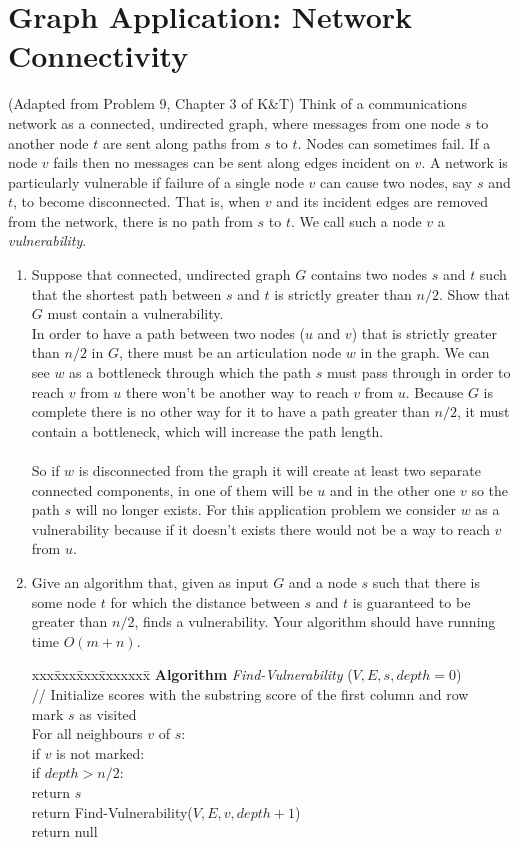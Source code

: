 \documentclass[11pt]{article}
\def\ans#1{{\color{ans}#1}}
\begin{document}
\section{Graph Application: Network Connectivity}
\label{sec-4}
(Adapted from Problem 9, Chapter 3 of K\&T) Think of a communications
network  as a connected, undirected graph, where messages from one node $s$ to another node
$t$ are sent along paths from $s$ to $t$.  Nodes can sometimes fail.
If a node $v$ fails then no messages can be sent along edges incident
on $v$. A network is particularly vulnerable if failure of a
single node $v$ can cause two nodes, say $s$ and $t$, to become
disconnected. That is, when $v$ and its incident edges are removed
from the network, there is no path from $s$ to $t$.
We call such a node $v$ a \emph{vulnerability}.

\begin{enumerate}
\item Suppose that connected, undirected graph $G$ contains two nodes $s$ and $t$ such
that the shortest path between $s$ and $t$ is strictly greater than
$n/2$. Show that $G$ must contain a vulnerability. \\
\ans{
  In order to have a path between two nodes ($u$ and $v$) that is strictly greater than $n/2$ in $G$, 
  there must be an articulation node $w$ in the graph. We can see $w$ as a bottleneck through which the 
  path $s$ must pass through in order to reach $v$ from $u$ there won't be another way to reach $v$ 
  from $u$. Because $G$ is complete there is no other way for it to have a path greater than $n/2$, 
  it must contain a bottleneck, which will increase the path length. \\ \\
  So if $w$ is disconnected from the graph it will create at least two separate connected 
  components, in one of them will be $u$ and in the other one $v$ so the path $s$ will 
  no longer exists. For this application problem we consider $w$ as a vulnerability 
  because if it doesn't exists there would not be a way to reach $v$ from $u$.
}

\item Give an algorithm that, given as input $G$ and a node $s$ such that
there is some node $t$ for which the distance between $s$ and $t$
is guaranteed to be greater than $n/2$, finds a vulnerability. Your
algorithm should have running time $O(m + n)$.
\begin{tabbing}
  xxx\=xxx\=xxx\=xxxxxxx\= \kill \color{ans}
  {\bf Algorithm} {\em Find-Vulnerability} ($V,E,s, depth=0$)\\ [0pt \color{ans}]
  \> // Initialize scores with the substring score of the first column and row \\
  \> mark $s$ as visited \\
  \> For all neighbours $v$ of $s$: \\
  \>\> if $v$ is not marked: \\
  \>\>\> if $depth > n/2$: \\
  \>\>\>\> return $s$ \\
  \>\>\> return Find-Vulnerability($V,E,v,depth+1$) \\
  \> return null
\end{tabbing}
\end{enumerate}
\end{document}
